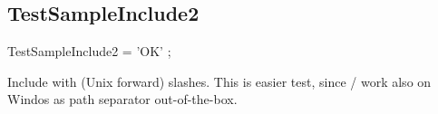 \documentclass{report}
\newif\ifpdf
\begin{document}
\subsection*{TestSampleInclude2}
\fi
\label{ok_include_from_parent_dir-TestSampleInclude2}
\begin{list}{}{
\setlength{\itemindent}{0cm}
\setlength{\listparindent}{0cm}
\setlength{\leftmargin}{\evensidemargin}
\addtolength{\leftmargin}{\tmplength}
\settowidth{\labelsep}{X}
\addtolength{\leftmargin}{\labelsep}
\setlength{\labelwidth}{\tmplength}
}
\item[\textbf{Declaration}\hfill]
\ifpdf
\begin{flushleft}
\fi
\begin{ttfamily}
TestSampleInclude2 =  'OK' ;\end{ttfamily}

\ifpdf
\end{flushleft}
\fi

\par
\item[\textbf{Description}]
Include with (Unix forward) slashes. This is easier test, since / work also on Windos as path separator out{-}of{-}the{-}box.

\end{list}
\end{document}
